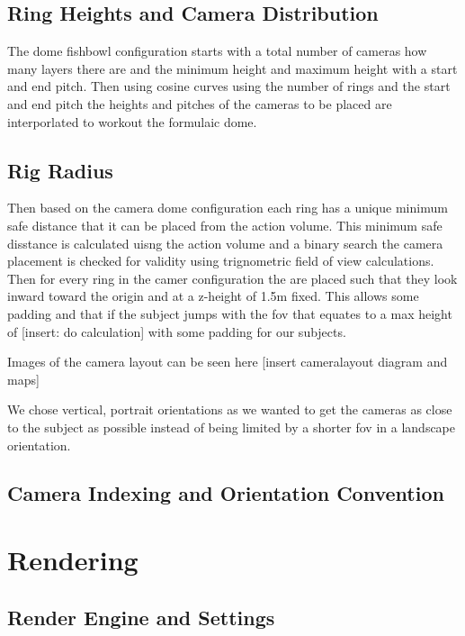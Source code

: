 \subsection{Ring Heights and Camera Distribution}

The dome fishbowl configuration starts with a total number of cameras how many layers there are and the minimum height and maximum height with a start and end pitch. Then using cosine curves using the number of rings and the start and end pitch the heights and pitches of the cameras to be placed are interporlated to workout the formulaic dome.

\subsection{Rig Radius}

Then based on the camera dome configuration each ring has a unique minimum safe distance that it can be placed from the action volume. This minimum safe disstance is calculated uisng the action volume and a binary search the camera placement is checked for validity using trignometric field of view calculations. Then for every ring in the camer configuration the are placed such that they look inward toward the origin and at a z-height of 1.5m fixed. This allows some padding and that if the subject jumps with the fov that equates to a max height of [insert: do calculation] with some padding for our subjects.

Images of the camera layout can be seen here [insert cameralayout diagram and maps]

We chose vertical, portrait orientations as we wanted to get the cameras as close to the subject as possible instead of being limited by a shorter fov in a landscape orientation.

\subsection{Camera Indexing and Orientation Convention}

\section{Rendering}
\label{sec:rendering}

\subsection{Render Engine and Settings}

